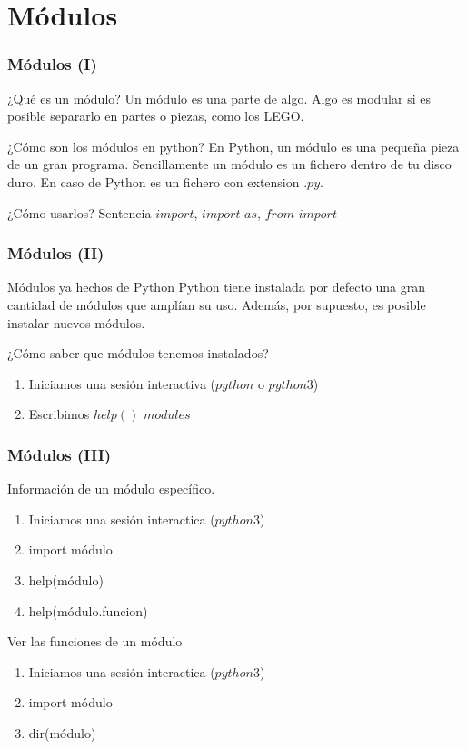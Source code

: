 \documentclass{beamer}
\begin{document}
\section{Módulos}

\begin{frame}
\frametitle{Módulos (I)}
\begin{block}{¿Qué es un módulo?}
Un módulo es una parte de algo. Algo es modular si es posible separarlo en partes o piezas, como los LEGO.
\end{block}
\pause
\begin{exampleblock}{¿Cómo son los módulos en python?}
 En Python, un módulo es una pequeña pieza de un gran programa. Sencillamente un módulo es un fichero dentro de tu disco duro. En caso de Python es un fichero con extension $.py$.
\end{exampleblock}
\pause
\begin{block}{¿Cómo usarlos?}
Sentencia $import$, $import$ $as$, $from$ $import$
\end{block}
\end{frame}

\begin{frame}
\frametitle{Módulos (II)}
\begin{block}{Módulos ya hechos de Python}
Python tiene instalada por defecto una gran cantidad de módulos que amplían su uso. Además, por supuesto, es posible instalar nuevos módulos.
\end{block}
\begin{block}{¿Cómo saber que módulos tenemos instalados?}
\begin{enumerate}
\item Iniciamos una sesión interactiva ($python$ o $python3$)
\item Escribimos $help()$ $modules$
\end{enumerate}
\end{block}

\end{frame}

\begin{frame}
\frametitle{Módulos (III)}
\begin{block}{Información de un módulo específico.}
\begin{enumerate}
\item Iniciamos una sesión interactica ($python3$)
\item import módulo
\item help(módulo)
\item help(módulo.funcion)
\end{enumerate}
\end{block}
\begin{block}{Ver las funciones de un módulo}
\begin{enumerate}
\item Iniciamos una sesión interactica ($python3$)
\item import módulo
\item dir(módulo)
\end{enumerate}
\end{block}
\end{frame}
\end{document}
